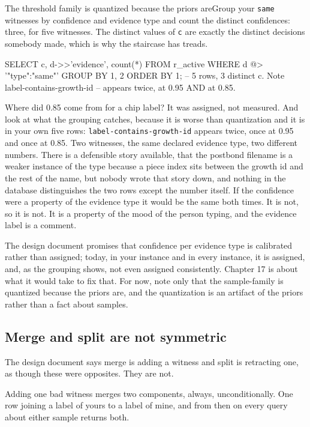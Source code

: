 \begin{Correspondence}{The threshold family is quantized because the priors are}{Group your \texttt{same} witnesses by confidence and evidence type and count the distinct confidences: three, for five witnesses.}
The distinct values of \texttt{c} are exactly the distinct decisions somebody made, which is why the staircase has treads.
\begin{Check}
SELECT c, d->>'evidence', count(*)
  FROM r_active
 WHERE d @> '{"type":"same"}'
 GROUP BY 1, 2
 ORDER BY 1;      -- 5 rows, 3 distinct c. Note label-contains-growth-id
                  -- appears twice, at 0.95 AND at 0.85.
\end{Check}
Where did 0.85 come from for a chip label? It was assigned, not measured. And look at what the grouping catches, because it is worse than quantization and it is in your own five rows: \texttt{label-contains-growth-id} appears twice, once at 0.95 and once at 0.85. Two witnesses, the same declared evidence type, two different numbers. There is a defensible story available, that the postbond filename is a weaker instance of the type because a piece index sits between the growth id and the rest of the name, but nobody wrote that story down, and nothing in the database distinguishes the two rows except the number itself. If the confidence were a property of the evidence type it would be the same both times. It is not, so it is not. It is a property of the mood of the person typing, and the evidence label is a comment.

The design document promises that confidence per evidence type is calibrated rather than assigned; today, in your instance and in every instance, it is assigned, and, as the grouping shows, not even assigned consistently. Chapter 17 is about what it would take to fix that. For now, note only that the sample-family is quantized because the priors are, and the quantization is an artifact of the priors rather than a fact about samples.
\end{Correspondence}

\subsection{Merge and split are not symmetric}

The design document says merge is adding a witness and split is retracting one, as though these were opposites. They are not.

Adding one bad witness merges two components, always, unconditionally. One row joining a label of yours to a label of mine, and from then on every query about either sample returns both.

